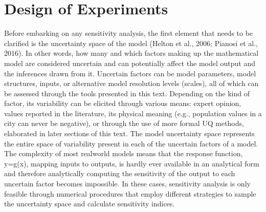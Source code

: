 \documentclass[letterpaper,10pt,english]{sphinxmanual}
\begin{document}
\section{Design of Experiments}
\label{\detokenize{3_sensitivity_analysis_the_basics:design-of-experiments}}
\sphinxAtStartPar
Before embarking on any sensitivity analysis, the first element that needs to be clarified is the uncertainty space of the model (Helton et al., 2006; Pianosi et al., 2016). In other words, how many and which factors making up the mathematical model are considered uncertain and can potentially affect the model output and the inferences drawn from it. Uncertain factors can be model parameters, model structures, inputs, or alternative model resolution levels (scales), all of which can be assessed through the tools presented in this text. Depending on the kind of factor, its variability can be elicited through various means: expert opinion, values reported in the literature, its physical meaning (e.g., population values in a city can never be negative), or through the use of more formal UQ methods, elaborated in later sections of this text. The model uncertainty space represents the entire space of variability present in each of the uncertain factors of a model. The complexity of most real\sphinxhyphen{}world models means that the response function, y=g(x), mapping inputs to outputs, is hardly ever available in an analytical form and therefore analytically computing the sensitivity of the output to each uncertain factor becomes impossible. In these cases, sensitivity analysis is only feasible through numerical procedures that employ different strategies to sample the uncertainty space and calculate sensitivity indices.
\end{document}
